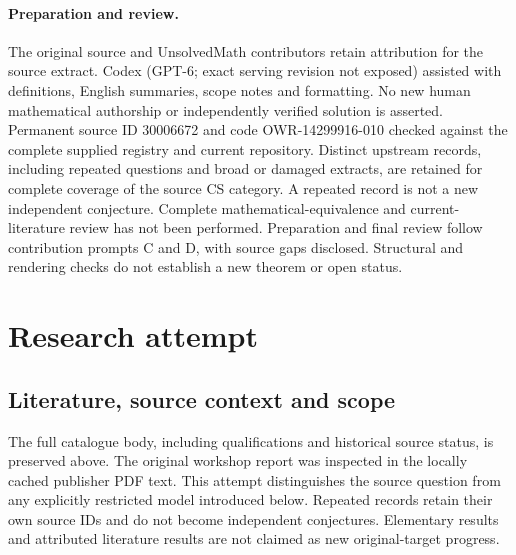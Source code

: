 \documentclass[11pt]{article}
\begin{document}
\paragraph{Preparation and review.}
The original source and UnsolvedMath contributors retain attribution for the source extract. Codex (GPT-6; exact serving revision not exposed) assisted with definitions, English summaries, scope notes and formatting. No new human mathematical authorship or independently verified solution is asserted. Permanent source ID 30006672 and code OWR-14299916-010 checked against the complete supplied registry and current repository. Distinct upstream records, including repeated questions and broad or damaged extracts, are retained for complete coverage of the source CS category. A repeated record is not a new independent conjecture. Complete mathematical-equivalence and current-literature review has not been performed. Preparation and final review follow contribution prompts C and D, with source gaps disclosed. Structural and rendering checks do not establish a new theorem or open status.
\label{end:30006672}

\section{Research attempt}
\subsection{Literature, source context and scope}
The full catalogue body, including qualifications and historical source status, is preserved above. The original workshop report was inspected in the locally cached publisher PDF text. This attempt distinguishes the source question from any explicitly restricted model introduced below. Repeated records retain their own source IDs and do not become independent conjectures. Elementary results and attributed literature results are not claimed as new original-target progress.
\end{document}
